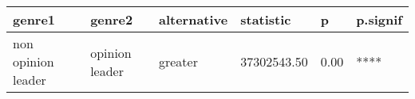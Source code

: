 \begin{table}
\centering
\begin{tabular}[t]{llllll}
\toprule
genre1 & genre2 & alternative & statistic & p & p.signif\\
\midrule
non opinion leader & opinion leader & greater & 37302543.50 & 0.00 & ****\\
\bottomrule
\end{tabular}
\end{table}
